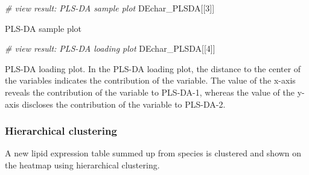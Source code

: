 \documentclass[]{article}
\newcommand{\hlnum}[1]{\textcolor[rgb]{0.816,0.125,0.439}{#1}}%
\newcommand{\hlcom}[1]{\textcolor[rgb]{0.502,0.502,0.502}{\textit{#1}}}%
\newcommand{\hlstd}[1]{\textcolor[rgb]{0.251,0.251,0.251}{#1}}%
\newenvironment{Shaded}{\begin{myshaded}}{\end{myshaded}}
\newcommand{\DecValTok}[1]{\hlnum{#1}}
\newcommand{\CommentTok}[1]{\hlcom{#1}}
\newcommand{\NormalTok}[1]{\hlstd{#1}}
\begin{document}
\begin{Shaded}
\begin{Highlighting}[]
\CommentTok{# view result: PLS-DA sample plot}
\NormalTok{DEchar_PLSDA[[}\DecValTok{3}\NormalTok{]]  }
\end{Highlighting}
\end{Shaded}

\label{fig:unnamed-chunk-52}PLS-DA sample plot

\begin{Shaded}
\begin{Highlighting}[]
\CommentTok{# view result: PLS-DA loading plot}
\NormalTok{DEchar_PLSDA[[}\DecValTok{4}\NormalTok{]]}
\end{Highlighting}
\end{Shaded}

\label{fig:unnamed-chunk-53}PLS-DA loading plot. In the PLS-DA loading plot, the distance to the center of the variables indicates the contribution of the variable. The value of the x-axis reveals the contribution of the variable to PLS-DA-1, whereas the value of the y-axis discloses the contribution of the variable to PLS-DA-2.

\hypertarget{hierarchical-clustering}{%
\subsubsection{Hierarchical clustering}\label{hierarchical-clustering}}

A new lipid expression table summed up from species is clustered and shown on the heatmap using hierarchical clustering.
\end{document}

